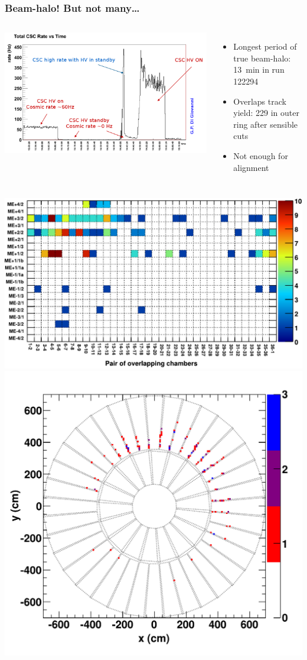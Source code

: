 \documentclass[compress]{beamer}
\begin{document}
\begin{frame}
\frametitle{Beam-halo!  But not many\ldots}
\begin{columns}
\includegraphics[width=0.9\linewidth]{trigger_plot.png}

\begin{itemize}\setlength{\itemsep}{-0.05 cm}
\item Longest period of true beam-halo: 13~min in run 122294
\item Overlaps track yield: 229 in outer ring after sensible cuts
\item Not enough for alignment
\end{itemize}
\end{columns}

\vspace{-0.3 cm}
\includegraphics[height=4 cm]{occupancy_121964_122294.pdf}
\includegraphics[height=4.5 cm]{overlaps_xypos_121964_122294.pdf}
\end{frame}
\end{document}

